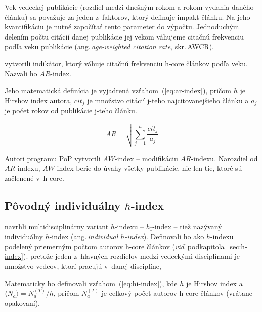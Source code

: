 Vek vedeckej publikácie (rozdiel medzi dnešným rokom a rokom vydania daného
článku) sa považuje za jeden z~faktorov, ktorý definuje impakt článku.  Na jeho
kvantifikáciu je nutné započítať tento parameter do výpočtu.  Jednoduchým
delením počtu citácií danej publikácie jej vekom váhujeme citačnú frekvenciu
podľa veku publikácie (ang.\,\emph{age-weighted citation rate}, skr.\,AWCR).

\citet{Jin2007} vytvorili indikátor, ktorý váhuje citačnú frekvenciu h-core
článkov podľa veku.  Nazvali ho $\mathit{AR}$-index.

Jeho matematická definícia je vyjadrená vzťahom~(\ref{eq:ar-index}), pričom $h$
je Hirshov index autora, $\mathit{cit}_j$ je množstvo citácií j-teho
najcitovanejšieho článku a $a_j$ je počet rokov od publikácie j-teho článku.

\begin{equation}
\label{eq:ar-index}
\mathit{AR} = \sqrt{\sum_{j=1}^h{\frac{\mathit{cit}_j}{a_j}}}
\end{equation}

Autori programu PoP 
vytvorili $\mathit{AW}$-index -- modifikáciu $\mathit{AR}$-indexu.  Narozdiel
od $\mathit{AR}$-indexu, $\mathit{AW}$-index berie do úvahy všetky publikácie,
nie len tie, ktoré sú začlenené v~h-core.


\subsection{Pôvodný individuálny $h$-index}
\label{sec:hi-index}

\citet{Batista2006} navrhli multidisciplinárny variant
$h$-indexu -- $h_{\mathrm{I}}$-index -- tiež nazývaný individuálny $h$-index
(ang.\,\emph{individual $h$-index}).  Definovali ho ako $h$-indexu podelený
priemerným počtom autorov h-core článkov
(\emph{viď}~podkapitola~\ref{sec:h-index}).  pretože jeden z~hlavných rozdielov
medzi vedeckými disciplínami je množstvo vedcov, ktorí pracujú v~danej
disciplíne,


Matematicky ho definovali vzťahom~(\ref{eq:hi-index}), kde $h$ je Hirshov index
a $\langle N_a \rangle = N_a^{(T)} / h$, pričom $N_a^{(T)}$ je celkový počet
autorov h-core článkov (vrátane opakovaní).

